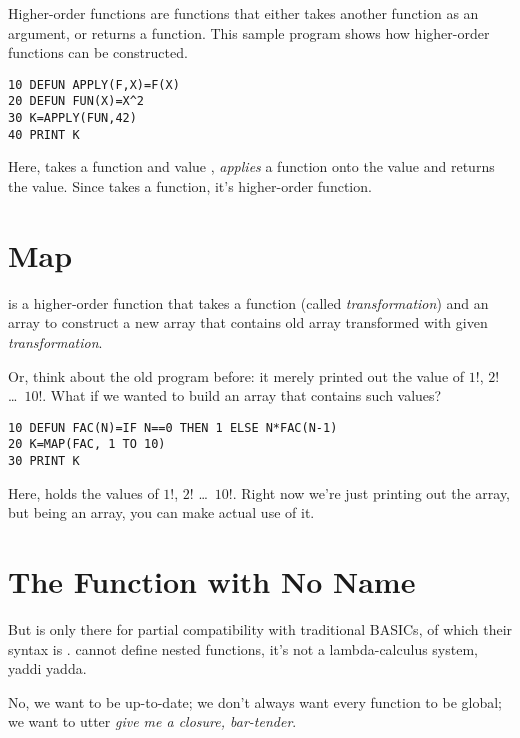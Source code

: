 Higher-order functions are functions that either takes another function as an argument, or returns a function. This sample program shows how higher-order functions can be constructed.

\begin{lstlisting}
10 DEFUN APPLY(F,X)=F(X)
20 DEFUN FUN(X)=X^2
30 K=APPLY(FUN,42)
40 PRINT K
\end{lstlisting}

Here,  takes a function  and value , \emph{applies} a function  onto the value  and returns the value. Since  takes a function, it's higher-order function.

\section[MAPping]{Map}

 is a higher-order function that takes a function (called \emph{transformation}) and an array to construct a new array that contains old array transformed with given \emph{transformation}.

Or, think about the old  program before: it merely printed out the value of $1!$, $2!$ \ldots\ $10!$. What if we wanted to build an array that contains such values?

\begin{lstlisting}
10 DEFUN FAC(N)=IF N==0 THEN 1 ELSE N*FAC(N-1)
20 K=MAP(FAC, 1 TO 10)
30 PRINT K
\end{lstlisting}

Here,  holds the values of $1!$, $2!$ \ldots\ $10!$. Right now we're just printing out the array, but being an array, you can make actual use of it.

\section[Closure]{The Function with No Name}

But  is only there for partial compatibility with traditional BASICs, of which their syntax is .  cannot define nested functions, it's not a lambda-calculus system, yaddi yadda.

No, we want to be up-to-date; we don't always want every function to be global; we want to utter \emph{give me a closure, bar-tender}.

